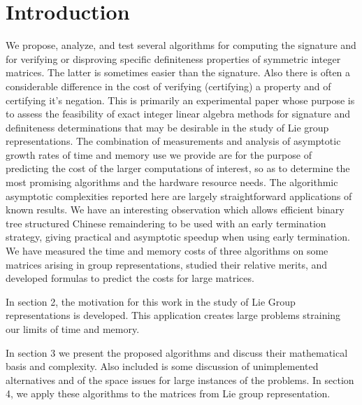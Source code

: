 \documentclass{acm_proc_article-sp}
\begin{document}


\section{Introduction}

We propose, analyze, and test several algorithms for 
computing the signature and for verifying or disproving specific
definiteness properties of symmetric integer matrices.  
The latter is sometimes easier than the signature.  
Also there is often a considerable difference in the 
cost of verifying (certifying) a property and of certifying it's negation.
This is primarily an experimental paper whose purpose is to assess the feasibility 
of exact integer linear algebra methods for signature and definiteness determinations
that may be desirable in the study of Lie group representations.
The combination of measurements and analysis of asymptotic growth rates of time
and memory use we provide are for the purpose of predicting the cost of the larger
computations of interest, so as to determine the most promising algorithms and the 
hardware resource needs.
The algorithmic asymptotic complexities reported here are largely straightforward 
applications of known results.  We have an interesting observation which
allows efficient binary tree structured Chinese remaindering to be used 
with an early termination strategy,
giving practical and asymptotic speedup when using early termination.
We have measured the time and memory costs of three algorithms on some matrices arising
in group representations, 
studied their relative merits, and developed formulas to predict the costs for large matrices.

In section 2, the motivation for this work in the study of Lie Group
representations is developed.  This application creates large problems
straining our limits of time and memory.

In section 3 we present the proposed algorithms and discuss their mathematical
basis and complexity.
Also included is some discussion
of unimplemented alternatives and of the space issues for large instances
of the problems. In section 4, we apply these algorithms to the matrices from 
Lie group representation.
\end{document}
